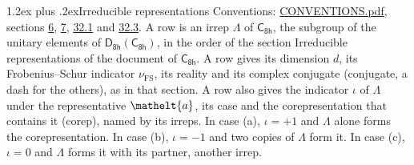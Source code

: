 \documentclass[10pt,a4paper]{article}
\makeatletter
\renewcommand\section{\@startsection{section}{1}{\z@}{-3ex plus -1ex minus -.2ex}%
  {1.2ex plus .2ex}{\normalfont\large\sffamily\bfseries\color{parttitle}}}
\numberwithin{equation}{section}
\newcommand{\eltfont}[1]{{\let\sigma\eltsigma\mathelt{#1}}}
\newcommand{\grp}[1]{\mathsf{#1}}
\newcommand{\elt}[1]{\eltfont{#1}}
\newcommand{\fsind}{\nu_{\mathrm{FS}}}
\makeatother
\begin{document}
\section{Irreducible representations}\label{s:irreps}
Conventions: \href{../../CONVENTIONS.pdf}{CONVENTIONS.pdf}, sections \href{../../../rotation/CONVENTIONS.pdf\#conv.6}{6}, \href{../../../rotation/CONVENTIONS.pdf\#conv.7}{7}, \href{../../CONVENTIONS.pdf\#conv.32.1}{32.1} and \href{../../CONVENTIONS.pdf\#conv.32.3}{32.3}.
\leavevmode\label{n:irrep.Delta}A row is an irrep $\Lambda$ of $\grp{C_{8h}}$, the subgroup of the unitary elements of $\grp{D_{8h}}(\grp{C_{8h}})$, in the order of the section Irreducible representations of the document of \href{../../../rotation/data/pdf/C8h.pdf}{$\grp{C_{8h}}$}. \label{n:index.dimension}\label{n:index.frobenius}\label{n:head.irrep}\label{n:head.reality}\label{n:head.conjugate}A row gives its dimension $d$, its Frobenius--Schur indicator $\fsind$, its reality and its complex conjugate (conjugate, a dash for the others), as in that section. \label{n:head.case.corep}\label{n:head.corep}A row also gives the indicator $\iota$ of $\Lambda$ under the representative $\elt{a}$, its case and the corepresentation that contains it (corep), named by its irreps. In case (a), $\iota = +1$ and $\Lambda$ alone forms the corepresentation. In case (b), $\iota = -1$ and two copies of $\Lambda$ form it. In case (c), $\iota = 0$ and $\Lambda$ forms it with its partner, another irrep.
\setlength{\emergencystretch}{2em}\par\setlength{\emergencystretch}{0pt}
\end{document}
